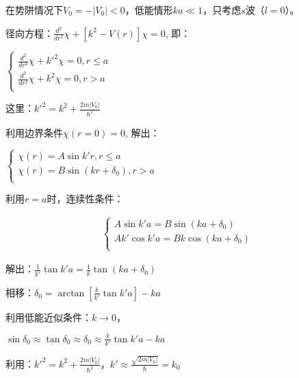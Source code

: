 在势阱情况下$V_0  =  - \left| {V_0 } \right| < 0$，低能情形$ka \ll 1$，只考虑$s$波（$l=0$）。

径向方程：$\frac{{d^2 }}{{dr^2 }}\chi  + \left[ {k^2  - V(r)} \right]\chi  = 0$, 即：


\begin{center}
$\left\{ \begin{array}{l}
 \frac{{d^2 }}{{dr^2 }}\chi  + k'^2 \chi  = 0,r \le a \\
 \frac{{d^2 }}{{dr^2 }}\chi  + k^2 \chi  = 0,r > a \\
 \end{array} \right.$
\end{center}



这里：$k'^2  = k^2  + \frac{{2m\left| {V_0 } \right|}}{{\hbar ^2 }}$


利用边界条件$\chi (r = 0) = 0$, 解出：


\begin{center}
$\left\{ \begin{array}{l}
 \chi (r) = A\sin k'r,r \le a \\
 \chi (r) = B\sin \left( {kr + \delta _0 } \right),r > a \\
 \end{array} \right.$
\end{center}

利用$r=a$时，连续性条件：

\begin{eqnarray*}
\left\{ \begin{array}{l}
 A\sin k'a = B\sin \left( {ka + \delta _0 } \right) \\
 Ak'\cos k'a = Bk\cos \left( {ka + \delta _0 } \right) \\
 \end{array} \right.
 \end{eqnarray*}

解出：$\frac{1}{{k'}}\tan k'a = \frac{1}{k}\tan \left( {ka + \delta _0 } \right)$


相移：$\delta _0  = \arctan \left[ {\frac{k}{{k'}}\tan k'a} \right] - ka$


利用低能近似条件：$k \to 0$，

\begin{center}
$\sin \delta _0  \approx \tan \delta _0  \approx \delta _0  \approx \frac{k}{{k'}}\tan k'a - ka$
\end{center}


利用：$k'^2  = k^2  + \frac{{2m\left| {V_0 } \right|}}{{\hbar ^2 }}$，$k' \approx \frac{{\sqrt {2m\left| {V_0 } \right|} }}{\hbar } = k_0 $


